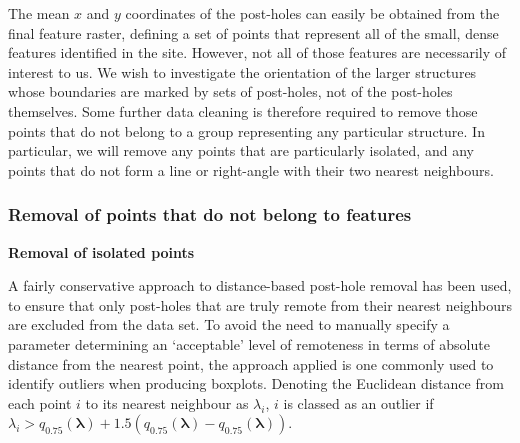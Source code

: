 \documentclass[../../ArchStats.tex]{subfiles}
\begin{document}
The mean $x$ and $y$ coordinates of the post-holes can easily be obtained from the final feature raster, defining a set of points that represent all of the small, dense features identified in the site. However, not all of those features are necessarily of interest to us. We wish to investigate the orientation of the larger structures whose boundaries are marked by sets of post-holes, not of the post-holes themselves. Some further data cleaning is therefore required to remove those points that do not belong to a group representing any particular structure. In particular, we will remove any points that are particularly isolated, and any points that do not form a line or right-angle with their two nearest neighbours.

\subsubsection{Removal of points that do not belong to features}
\label{sec:filter-rectilinear}
\textbf{Removal of isolated points}

A fairly conservative approach to distance-based post-hole removal has been used, to ensure that only post-holes that are truly remote from their nearest neighbours are excluded from the data set. To avoid the need to manually specify a parameter determining an `acceptable' level of remoteness in terms of absolute distance from the nearest point, the approach applied is one commonly used to identify outliers when producing boxplots. Denoting the Euclidean distance from each point $i$ to its nearest neighbour as $\lambda_i$, $i$ is classed as an outlier if $\lambda_i > q_{0.75}(\boldsymbol{\lambda}) + 1.5 \left(q_{0.75}(\boldsymbol{\lambda}) - q_{0.75}(\boldsymbol{\lambda}) \right)$.

\vspace{10pt}


\end{document}
